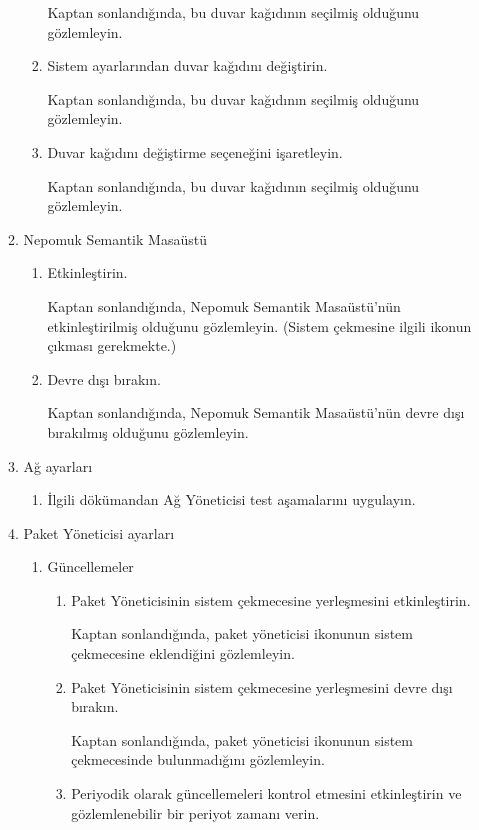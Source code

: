 \documentclass[a4paper,10pt]{article}
\begin{document}
\begin{enumerate}
\begin{enumerate}
\begin{enumerate}
	Kaptan sonlandığında, bu duvar kağıdının seçilmiş olduğunu gözlemleyin.
	\item Sistem ayarlarından duvar kağıdını değiştirin.

	Kaptan sonlandığında, bu duvar kağıdının seçilmiş olduğunu gözlemleyin.
	\item Duvar kağıdını değiştirme seçeneğini işaretleyin.

	Kaptan sonlandığında, bu duvar kağıdının seçilmiş olduğunu gözlemleyin.
	\end{enumerate}

    \item Nepomuk Semantik Masaüstü
        \begin{enumerate}
        \item Etkinleştirin.
	
	Kaptan sonlandığında, Nepomuk Semantik Masaüstü'nün etkinleştirilmiş olduğunu gözlemleyin. (Sistem çekmesine ilgili ikonun çıkması gerekmekte.)
        \item Devre dışı bırakın.

	Kaptan sonlandığında, Nepomuk Semantik Masaüstü'nün devre dışı bırakılmış olduğunu gözlemleyin.
        \end{enumerate}

    \item Ağ ayarları
        \begin{enumerate}
        \item İlgili dökümandan Ağ Yöneticisi test aşamalarını uygulayın.
        \end{enumerate}

    \item Paket Yöneticisi ayarları
        \begin{enumerate}
        \item Güncellemeler
            \begin{enumerate}
            \item Paket Yöneticisinin sistem çekmecesine yerleşmesini etkinleştirin.

                Kaptan sonlandığında, paket yöneticisi ikonunun sistem çekmecesine eklendiğini gözlemleyin.
            \item Paket Yöneticisinin sistem çekmecesine yerleşmesini devre dışı bırakın.

                Kaptan sonlandığında, paket yöneticisi ikonunun sistem çekmecesinde bulunmadığını gözlemleyin.
            \item Periyodik olarak güncellemeleri kontrol etmesini etkinleştirin ve gözlemlenebilir bir periyot zamanı verin.
                

\end{enumerate}
\end{enumerate}
\end{enumerate}
\end{enumerate}
\end{document}
